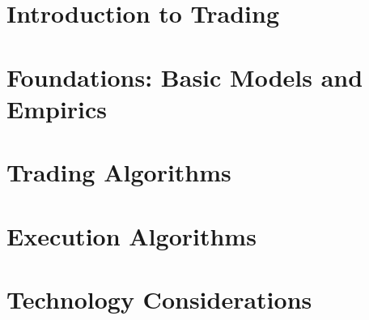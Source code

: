 \documentclass[krantz1]{style/krantz} %
\begin{document}
\raggedbottom

\frontmatter
\setcounter{page}{0}



\cleardoublepage
\tableofcontents



\mainmatter

\part{Introduction to Trading\label{part:one}}



\part{Foundations: Basic Models and Empirics\label{part:two}}





\part{Trading Algorithms\label{part:three}}





\part{Execution Algorithms\label{part:four}}





\part{Technology Considerations\label{part:five}}



%
%



%
\end{document}
